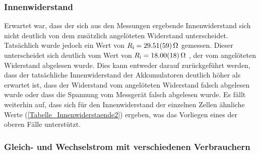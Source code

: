 \documentclass[
	a4paper,
	12pt,
	pagesize,
	ngerman
]{scrartcl}
\begin{document}
	\subsubsection{Innenwiderstand}
	Erwartet war, dass der sich aus den Messungen ergebende Innenwiderstand sich nicht deutlich von dem zusätzlich angelöteten Widerstand unterscheidet.
	Tatsächlich wurde jedoch ein Wert von $R_\text{i} = \SI{29,51 \pm 0,59}{\Omega}$ gemessen.
	Dieser unterscheidet sich deutlich vom Wert von $R_\text{i} = \SI{18 \pm 0,18}{\Omega}$ , der vom angelöteten Widerstand abgelesen wurde.
	Dies kann entweder darauf zurückgeführt werden, dass der tatsächliche Innenwiderstand der Akkumulatoren deutlich höher als erwartet ist, dass der Widerstand vom angelöteten Widerstand falsch abgelesen wurde oder dass die Spannung vom Messgerät falsch abgelesen wurde.
	Es fällt weiterhin auf, dass sich für den Innenwiderstand der einzelnen Zellen ähnliche Werte (\cref{Tabelle_Innenwiderstaende2}) ergeben, was das Vorliegen eines der oberen Fälle unterstützt.
	
	\subsubsection{Gleich- und Wechselstrom mit verschiedenen Verbrauchern}
	
\end{document}
